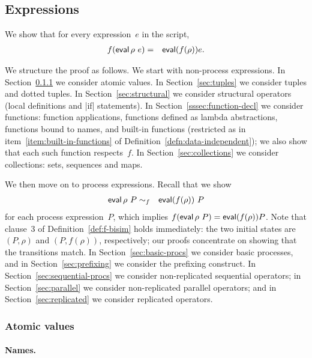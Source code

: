 \subsection{Expressions}

We show that for every expression~$e$ in the script,
\begin{eqnarray*}
f(\mathop{\sf eval} \rho ~ e) & = & \mathop{\sf eval} (f(\rho)) e .
\end{eqnarray*}

We structure the proof as follows.  We start with non-process expressions.  In
Section~\ref{sec:atomic} we consider atomic values.  In
Section~\ref{sec:tuples} we consider tuples and dotted tuples.  In
Section~\ref{sec:structural} we consider structural operators (local
definitions and |if| statements).  In Section~\ref{sssec:function-decl} we
consider functions: function applications, functions defined as lambda
abstractions, functions bound to names, and built-in functions (restricted as
in item~\ref{item:built-in-functions} of
Definition~\ref{defn:data-independent}); we also show that each such function
respects~$f$.  In Section~\ref{sec:collections} we consider collections: sets,
sequences and maps.

We then move on to process expressions.  Recall that we show 
\begin{eqnarray*}
\mathop{\sf eval} \rho ~ P & \sim_f & \mathop{\sf eval} (f(\rho)) ~P
\end{eqnarray*}
%
for each process expression~$P$, which implies $f(\mathop{\sf eval} \rho ~ P) = \mathop{\sf eval}
(f(\rho)) P$.  Note that clause~3 of Definition~\ref{def:f-bisim} holds
immediately: the two initial states are $(P,\rho)$ and $(P,f(\rho))$,
respectively; our proofs concentrate on showing that the transitions match.
%
In Section~\ref{sec:basic-procs} we consider basic processes, and in
Section~\ref{sec:prefixing} we consider the prefixing construct.  In
Section~\ref{sec:sequential-procs} we consider non-replicated sequential
operators; in Section~\ref{sec:parallel} we consider non-replicated parallel
operators; and in Section~\ref{sec:replicated} we consider replicated
operators.



\subsubsection{Atomic values}
\label{sec:atomic}

\paragraph{Names.}

